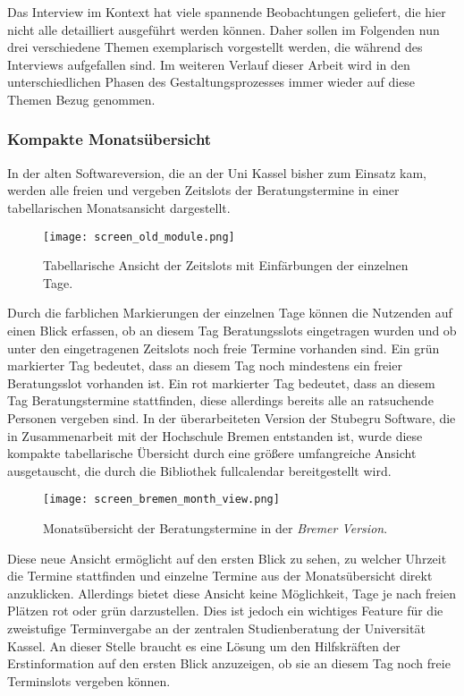Das Interview im Kontext hat viele spannende Beobachtungen geliefert, die hier
nicht alle detailliert ausgeführt werden können. Daher sollen im Folgenden nun
drei verschiedene Themen exemplarisch vorgestellt werden, die während des
Interviews aufgefallen sind. Im weiteren Verlauf dieser Arbeit wird in den
unterschiedlichen Phasen des Gestaltungsprozesses immer wieder auf diese Themen
Bezug genommen.

\subsubsection{Kompakte Monatsübersicht}
In der alten Softwareversion, die an der Uni Kassel bisher zum Einsatz kam,
werden alle freien und vergeben Zeitslots der Beratungstermine in einer
tabellarischen Monatsansicht dargestellt.

\begin{figure}[H]
    \caption{Tabellarische Ansicht der Zeitslots mit Einfärbungen der einzelnen Tage.}
    \centering
    \texttt{[image: screen\_old\_module.png]}
\end{figure}

Durch die farblichen Markierungen der einzelnen Tage können die Nutzenden auf einen
Blick erfassen, ob an diesem Tag Beratungsslots eingetragen wurden und ob unter
den eingetragenen Zeitslots noch freie Termine vorhanden sind. Ein grün
markierter Tag bedeutet, dass an diesem Tag noch mindestens ein freier
Beratungsslot vorhanden ist. Ein rot markierter Tag bedeutet, dass an diesem
Tag Beratungstermine stattfinden, diese allerdings bereits alle an ratsuchende
Personen vergeben sind. In der überarbeiteten Version der Stubegru Software,
die in Zusammenarbeit mit der Hochschule Bremen entstanden ist, wurde diese
kompakte tabellarische Übersicht durch eine größere umfangreiche Ansicht
ausgetauscht, die durch die Bibliothek \gls{fullcalendar} bereitgestellt wird.

\begin{figure}[H]
    \caption{Monatsübersicht der Beratungstermine in der \textit{Bremer Version}.}
    \centering
    \texttt{[image: screen\_bremen\_month\_view.png]}
\end{figure}

Diese neue Ansicht ermöglicht auf den ersten Blick zu sehen, zu welcher Uhrzeit
die Termine stattfinden und einzelne Termine aus der Monatsübersicht direkt
anzuklicken. Allerdings bietet diese Ansicht keine Möglichkeit, Tage je nach
freien Plätzen rot oder grün darzustellen. Dies ist jedoch ein wichtiges
Feature für die zweistufige Terminvergabe an der zentralen Studienberatung der
Universität Kassel. An dieser Stelle braucht es eine Lösung um den Hilfskräften
der Erstinformation auf den ersten Blick anzuzeigen, ob sie an diesem Tag noch
freie Terminslots vergeben können.

